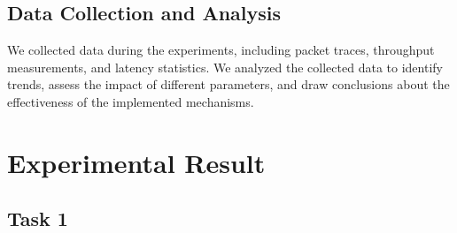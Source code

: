 \documentclass[11pt]{article}
\begin{document}
\subsection{Data Collection and Analysis}
We collected data during the experiments, including packet traces, throughput measurements, and latency statistics. We analyzed the collected data to identify trends, assess the impact of different parameters, and draw conclusions about the effectiveness of the implemented mechanisms.







\section{Experimental Result}

\subsection{Task 1}
\end{document}
